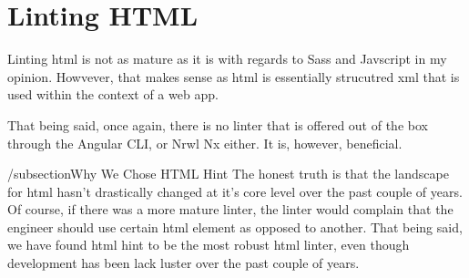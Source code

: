 \maketitle{}
\section{ Linting HTML }

Linting html is not as mature as it is with regards to Sass and Javscript in my
opinion. Howvever, that makes sense as html is essentially strucutred xml that
is used within the context of a web app.

That being said, once again, there is no linter that is offered out of the box
through the Angular CLI, or Nrwl Nx either. It is, however, beneficial.


/subsection{Why We Chose HTML Hint}
The honest truth is that the landscape for html hasn't drastically changed at
it's core level over the past couple of years. Of course, if there was a more
mature linter, the linter would complain that the engineer should use certain
html element as opposed to another. That being said, we have found html hint
to be the most robust html linter, even though development has been lack luster
over the past couple of years.
